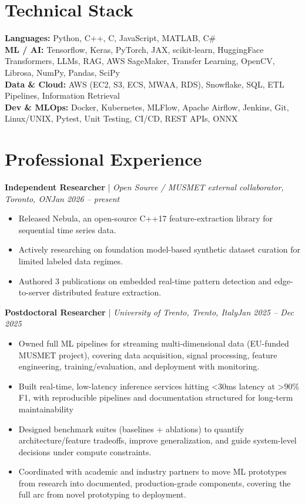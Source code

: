 \documentclass[11pt]{article}
\newenvironment{cvrole}[5]{%
  \par\noindent\textbf{\large #1} | \textit{\small #2, #3}\hfill \textit{\small #4 -- #5}\par
  \begin{itemize}[leftmargin=2em, itemsep=-0.3em, topsep=-0.5em]%
}{%
  \end{itemize}\par\noindent\mbox{}\par\vspace{0.1em}%
}
\begin{document}
\section*{Technical Stack}
\textbf{Languages:} Python, C++, C, JavaScript, MATLAB, C\#\\
\textbf{ML / AI:} Tensorflow, Keras, PyTorch, JAX, scikit-learn, HuggingFace Transformers, LLMs, RAG, AWS SageMaker, Transfer Learning, OpenCV, Librosa, NumPy, Pandas, SciPy\\
\textbf{Data \& Cloud:} AWS (EC2, S3, ECS, MWAA, RDS), Snowflake, SQL, ETL Pipelines, Information Retrieval\\
\textbf{Dev \& MLOps:} Docker, Kubernetes, MLFlow, Apache Airflow, Jenkins, Git, Linux/UNIX, Pytest, Unit Testing, CI/CD, REST APIs, ONNX

\section*{Professional Experience}
\begin{cvrole}{Independent Researcher}{Open Source / MUSMET external collaborator}{Toronto, ON}{Jan 2026}{present}
    \item Released Nebula, an open-source C++17 feature-extraction library for sequential time series data.
    \item Actively researching on foundation model-based synthetic dataset curation for limited labeled data regimes.
    \item Authored 3 publications on embedded real-time pattern detection and edge-to-server distributed feature extraction.
\end{cvrole}

\begin{cvrole}{Postdoctoral Researcher}{University of Trento}{Trento, Italy}{Jan 2025}{Dec 2025}
    \item Owned full ML pipelines for streaming multi-dimensional data (EU-funded MUSMET project), covering data acquisition, signal processing, feature engineering, training/evaluation, and deployment with monitoring.
    \item Built real-time, low-latency inference services hitting <30ms latency at >90\% F1, with reproducible pipelines and documentation structured for long-term maintainability
    \item Designed benchmark suites (baselines + ablations) to quantify architecture/feature tradeoffs, improve generalization, and guide system-level decisions under compute constraints.
    \item Coordinated with academic and industry partners to move ML prototypes from research into documented, production-grade components, covering the full arc from novel prototyping to deployment.
\end{cvrole}
\end{document}
